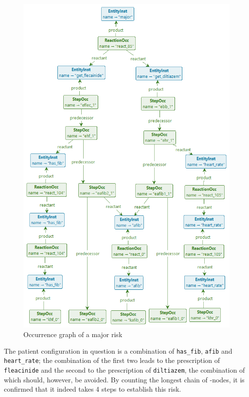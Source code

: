 \begin{figure}
\centering
\includegraphics[scale=.3]{./figs/cmsb-pruned}
\caption{Occurrence graph of a major risk}
\label{fig:cmsb-pruned}
\end{figure}

The patient configuration in question is a combination of \texttt{has\_fib}, \texttt{afib} and \texttt{heart\_rate}; the combination of the first two leads to the prescription of \texttt{fleacinide} and the second to the prescription of \texttt{diltiazem}, the combination of which should, however, be avoided. By counting the longest chain of \StepOcc-nodes, it is confirmed that it indeed takes 4 steps to establish this risk.

